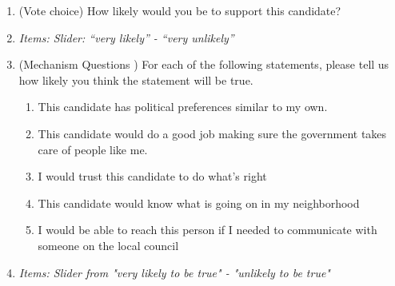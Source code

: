 \documentclass[12pt]{article}
\newcommand{\alerta}[1]{\textcolor{harvardcrimson}{#1}}
\begin{document}
\begin{enumerate}
   \item \alerta{(Vote choice)}  How likely would you be to support this candidate?
    \item[] \textit{Items: Slider: ``very likely'' - ``very unlikely''}
    
    \item \alerta{(Mechanism Questions
)} For each of the following statements, please tell us how likely you think the statement will be true.
    \begin{enumerate}
        \item This candidate has political preferences similar to my own.
        \item This candidate would do a good job making sure the government takes care of people like me.
        \item I would trust this candidate to do what's right
        \item This candidate would know what is going on in my neighborhood
        \item I would be able to reach this person if I needed to communicate with someone on the local council
    \end{enumerate}
    
    \item[] \textit{Items: Slider from "very likely to be true" - "unlikely to be true"}

\end{enumerate}
\end{document}
